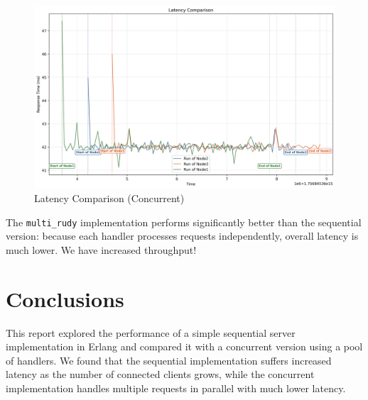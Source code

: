 \documentclass[a4paper, 11pt]{article}
\begin{document}
\begin{figure}[H]
  \centering
  \includegraphics[width=0.9\linewidth]{concurrent_benches/latency_plot.png}
  \caption{Latency Comparison (Concurrent)}
  \label{fig:latency_comparison_conc}
\end{figure}
\FloatBarrier

The \texttt{multi\_rudy} implementation performs significantly better than the sequential version: because each handler processes requests independently, overall latency is much lower. We have increased throughput!


\section{Conclusions}

This report explored the performance of a simple sequential server implementation in Erlang and compared it with a concurrent version using a pool of handlers. We found that the sequential implementation suffers increased latency as the number of connected clients grows, while the concurrent implementation handles multiple requests in parallel with much lower latency.
\end{document}
